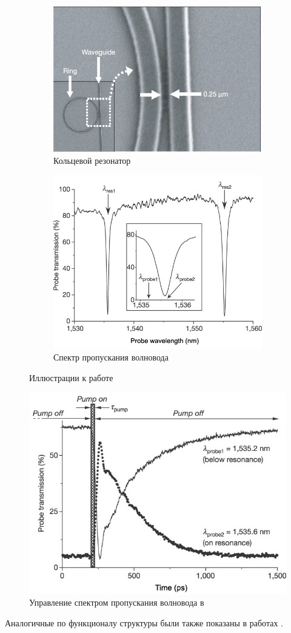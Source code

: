 \begin{figure}[h]
	\begin{subfigure}[b]{.53\textwidth}
		\centering
		\includegraphics[width=.9\textwidth]{img/ring}
		\caption{Кольцевой резонатор}
		\label{fig:ring}
	\end{subfigure}
	\begin{subfigure}[b]{.47\textwidth}
		\centering
		\includegraphics[width=.9\textwidth]{img/ring_spectrum}
		\caption{Спектр пропускания волновода}
		\label{fig:ring_spectrum}
	\end{subfigure}
	\caption{Иллюстрации к работе \cite{Vilson2004}}
\end{figure}

\begin{figure}[h]
	\centering
	\includegraphics[width=.6\textwidth]{img/ring_res_shift}
	\caption{Управление спектром пропускания волновода в \cite{Vilson2004}}
	\label{fig:ring_shift}
\end{figure}

Аналогичные по функционалу структуры были также показаны в работах \cite{Kippenberg2004, Gondarenko2009, Pollinger2009, Soltani2007}.